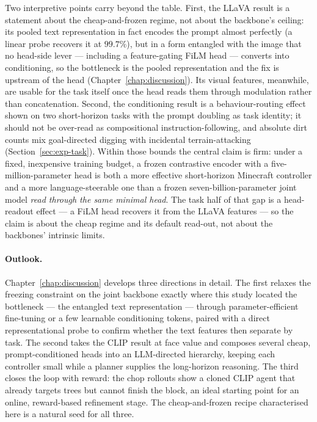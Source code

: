 Two interpretive points carry beyond the table. First, the LLaVA result is a
statement about the cheap-and-frozen regime, not about the backbone's ceiling: its
pooled text representation in fact encodes the prompt almost perfectly (a linear
probe recovers it at $99.7\%$), but in a form entangled with the image that no
head-side lever --- including a feature-gating FiLM head --- converts into
conditioning, so the bottleneck is the pooled representation and the fix is
upstream of the head (Chapter~\ref{chap:discussion}). Its visual features,
meanwhile, are usable for the task itself once the head reads them through
modulation rather than concatenation. Second, the conditioning result is a
behaviour-routing effect shown on two short-horizon tasks with the prompt doubling
as task identity; it should not be over-read as compositional
instruction-following, and absolute dirt counts mix goal-directed digging with
incidental terrain-attacking (Section~\ref{sec:exp-task}). Within those bounds the
central claim is firm: under a fixed, inexpensive training budget, a frozen
contrastive encoder with a five-million-parameter head is both a more effective
short-horizon Minecraft controller and a more language-steerable one than a frozen
seven-billion-parameter joint model \emph{read through the same minimal head}. The
task half of that gap is a head-readout effect --- a FiLM head recovers it from the
LLaVA features --- so the claim is about the cheap regime and its default
read-out, not about the backbones' intrinsic limits.

\paragraph{Outlook.} Chapter~\ref{chap:discussion} develops three directions in
detail. The first relaxes the freezing constraint on the joint backbone exactly
where this study located the bottleneck --- the entangled text representation ---
through parameter-efficient fine-tuning or a few learnable conditioning tokens,
paired with a direct representational probe to confirm whether the text features
then separate by task. The second takes the CLIP result at face value and composes
several cheap, prompt-conditioned heads into an LLM-directed hierarchy, keeping
each controller small while a planner supplies the long-horizon reasoning. The
third closes the loop with reward: the chop rollouts show a cloned CLIP agent that
already targets trees but cannot finish the block, an ideal starting point for an
online, reward-based refinement stage. The cheap-and-frozen recipe characterised
here is a natural seed for all three.

